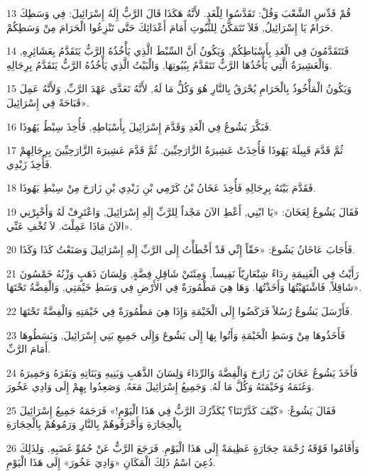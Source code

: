 \par 13 قُمْ قَدِّسِ الشَّعْبَ وَقُلْ: تَقَدَّسُوا لِلْغَدِ. لأَنَّهُ هَكَذَا قَالَ الرَّبُّ إِلَهُ إِسْرَائِيلَ: فِي وَسَطِكَ حَرَامٌ يَا إِسْرَائِيلُ, فَلاَ تَتَمَكَّنُ لِلثُّبُوتِ أَمَامَ أَعْدَائِكَ حَتَّى تَنْزِعُوا الْحَرَامَ مِنْ وَسَطِكُمْ.
\par 14 فَتَتَقَدَّمُونَ فِي الْغَدِ بِأَسْبَاطِكُمْ, وَيَكُونُ أَنَّ السِّبْطَ الَّذِي يَأْخُذُهُ الرَّبُّ يَتَقَدَّمُ بِعَشَائِرِهِ, وَالْعَشِيرَةُ الَّتِي يَأْخُذُهَا الرَّبُّ تَتَقَدَّمُ بِبُيُوتِهَا, وَالْبَيْتُ الَّذِي يَأْخُذُهُ الرَّبُّ يَتَقَدَّمُ بِرِجَالِهِ.
\par 15 وَيَكُونُ الْمَأْخُوذُ بِالْحَرَامِ يُحْرَقُ بِالنَّارِ هُوَ وَكُلُّ مَا لَهُ, لأَنَّهُ تَعَدَّى عَهْدَ الرَّبِّ, وَلأَنَّهُ عَمِلَ قَبَاحَةً فِي إِسْرَائِيلَ».
\par 16 فَبَكَّرَ يَشُوعُ فِي الْغَدِ وَقَدَّمَ إِسْرَائِيلَ بِأَسْبَاطِهِ, فَأُخِذَ سِبْطُ يَهُوذَا.
\par 17 ثُمَّ قَدَّمَ قَبِيلَةَ يَهُوذَا فَأُخِذَتْ عَشِيرَةُ الزَّارَحِيِّينَ. ثُمَّ قَدَّمَ عَشِيرَةَ الزَّارَحِيِّينَ بِرِجَالِهِمْ فَأُخِذَ زَبْدِي.
\par 18 فَقَدَّمَ بَيْتَهُ بِرِجَالِهِ فَأُخِذَ عَخَانُ بْنُ كَرْمِي بْنِ زَبْدِي بْنِ زَارَحَ مِنْ سِبْطِ يَهُوذَا.
\par 19 فَقَالَ يَشُوعُ لِعَخَانَ: «يَا ابْنِي, أَعْطِ الآنَ مَجْداً لِلرَّبِّ إِلَهِ إِسْرَائِيلَ, وَاعْتَرِفْ لَهُ وَأَخْبِرْنِي الآنَ مَاذَا عَمِلْتَ. لاَ تُخْفِ عَنِّي».
\par 20 فَأَجَابَ عَاخَانُ يَشُوعَ: «حَقّاً إِنِّي قَدْ أَخْطَأْتُ إِلَى الرَّبِّ إِلَهِ إِسْرَائِيلَ وَصَنَعْتُ كَذَا وَكَذَا.
\par 21 رَأَيْتُ فِي الْغَنِيمَةِ رِدَاءً شِنْعَارِيّاً نَفِيساً, وَمِئَتَيْ شَاقِلِ فِضَّةٍ, وَلِسَانَ ذَهَبٍ وَزْنُهُ خَمْسُونَ شَاقِلاً, فَاشْتَهَيْتُهَا وَأَخَذْتُهَا. وَهَا هِيَ مَطْمُورَةٌ فِي الأَرْضِ فِي وَسَطِ خَيْمَتِي, وَالْفِضَّةُ تَحْتَهَا».
\par 22 فَأَرْسَلَ يَشُوعُ رُسُلاً فَرَكَضُوا إِلَى الْخَيْمَةِ وَإِذَا هِيَ مَطْمُورَةٌ فِي خَيْمَتِهِ وَالْفِضَّةُ تَحْتَهَا.
\par 23 فَأَخَذُوهَا مِنْ وَسَطِ الْخَيْمَةِ وَأَتُوا بِهَا إِلَى يَشُوعَ وَإِلَى جَمِيعِ بَنِي إِسْرَائِيلَ, وَبَسَطُوهَا أَمَامَ الرَّبِّ.
\par 24 فَأَخَذَ يَشُوعُ عَخَانَ بْنَ زَارَحَ وَالْفِضَّةَ وَالرِّدَاءَ وَلِسَانَ الذَّهَبِ وَبَنِيهِ وَبَنَاتِهِ وَبَقَرَهُ وَحَمِيرَهُ وَغَنَمَهُ وَخَيْمَتَهُ وَكُلَّ مَا لَهُ, وَجَمِيعُ إِسْرَائِيلَ مَعَهُ, وَصَعِدُوا بِهِمْ إِلَى وَادِي عَخُورَ.
\par 25 فَقَالَ يَشُوعُ: «كَيْفَ كَدَّرْتَنَا؟ يُكَدِّرُكَ الرَّبُّ فِي هَذَا الْيَوْمِ!» فَرَجَمَهُ جَمِيعُ إِسْرَائِيلَ بِالْحِجَارَةِ وَأَحْرَقُوهُمْ بِالنَّارِ وَرَمُوهُمْ بِالْحِجَارَةِ
\par 26 وَأَقَامُوا فَوْقَهُ رُجْمَةَ حِجَارَةٍ عَظِيمَةً إِلَى هَذَا الْيَوْمِ. فَرَجَعَ الرَّبُّ عَنْ حُمُوِّ غَضَبِهِ. وَلِذَلِكَ دُعِيَ اسْمُ ذَلِكَ الْمَكَانِ «وَادِيَ عَخُورَ» إِلَى هَذَا الْيَوْمِ.

